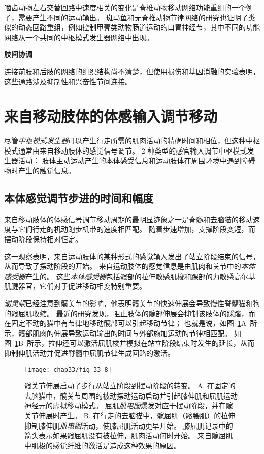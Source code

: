啮齿动物左右交替回路中速度相关的变化是脊椎动物移动网络功能重组的一个例子，需要产生不同的运动输出。
斑马鱼和无脊椎动物节律网络的研究也证明了类似的动态回路重组，例如控制甲壳类动物肠道运动的口胃神经节，其中不同的功能网络从一个共同的中枢模式发生器网络中出现。


\textbf{肢间协调}

连接前肢和后肢的网络的组织结构尚不清楚，但使用损伤和基因消融的实验表明，这些通路涉及抑制性和兴奋性节间连接。



\section{来自移动肢体的体感输入调节移动}

尽管\textit{中枢模式发生器}可以产生行走所需的肌肉活动的精确时间和相位，但这种中枢模式通常由来自移动肢体的感觉信号调节。
2 种类型的感官输入调节中枢模式发生器活动：
肢体主动运动产生的本体感受信息和运动肢体在周围环境中遇到障碍物时产生的触觉信息。



\subsection{本体感觉调节步进的时间和幅度}

来自移动肢体的体感信号调节移动周期的最明显迹象之一是脊髓和去脑猫的移动速度与它们行走的机动跑步机带的速度相匹配。
随着步速增加，支撑阶段变短，而摆动阶段保持相对恒定。


这一观察表明，来自运动肢体的某种形式的感觉输入发出了站立阶段结束的信号，从而导致了摆动阶段的开始。
来自运动肢体的感觉信息是由肌肉和关节中的\textit{本体感受器}产生的。
这些\textit{本体感受器}包括髋部的拉伸敏感肌梭和踝部的力敏感高尔基肌腱器官，它们对于促进移动相变特别重要。


\textit{谢灵顿}已经注意到髋关节的影响，他表明髋关节的快速伸展会导致慢性脊髓猫和狗的髋屈肌收缩。
最近的研究发现，阻止肢体的髋部伸展会抑制该肢体的踩踏，而在固定不动的猫中有节律地移动髋部可以引起移动节律；
也就是说，如图~\ref{fig:33_8}A~所示，髋部肌肉的伸展导致运动输出的时间与外部施加运动的节律相匹配。
如图~\ref{fig:33_8}B~所示，拉伸还可以激活屈肌梭并模拟在站立阶段结束时发生的延长，从而抑制伸肌活动并促进脊髓中屈肌节律生成回路的激活。


\begin{figure}[htbp]
	\centering
	\texttt{[image: chap33/fig\_33\_8]}
	\caption{髋关节伸展启动了步行从站立阶段到摆动阶段的转变。
	A. 在固定的去脑猫中，髋关节周围的被动摆动运动启动并引起膝伸肌和屈肌运动神经元的虚拟移动模式。
	屈肌\textit{肌电图}爆发对应于摆动阶段，并在髋关节伸展时产生\cite{kriellaars1994mechanical}。
	B. 在行走的去脑猫中，髋屈肌（髂腰肌）的拉伸抑制膝伸肌\textit{肌电图}活动，使膝屈肌活动更早开始。
	膝屈肌记录中的箭头表示如果髋屈肌没有被拉伸，肌肉活动何时开始。
	来自髋屈肌中肌梭的感觉纤维的激活是造成这种效果的原因\cite{hiebert1996contribution}。}
	\label{fig:33_8}
\end{figure}


